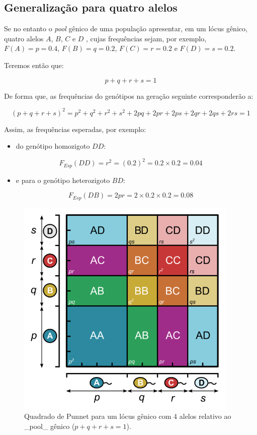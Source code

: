 \documentclass[
]{book}
\providecommand{\tightlist}{%
  \setlength{\itemsep}{0pt}\setlength{\parskip}{0pt}}
\begin{document}
\hypertarget{generalizauxe7uxe3o-para-quatro-alelos}{%
\subsection{Generalização para quatro alelos}\label{generalizauxe7uxe3o-para-quatro-alelos}}

Se no entanto o \emph{pool} gênico de uma população apresentar, em um lócus gênico, quatro alelos \(A\), \(B\), \(C\) e \(D\) , cujas frequências sejam, por exemplo, \(F(A) = p = 0.4\), \(F(B) = q = 0.2\), \(F(C) = r = 0.2\) e \(F(D) = s = 0.2\).

Teremos então que:

\[p + q + r + s = 1\]

De forma que, as frequências do genótipos na geração seguinte corresponderão a:

\[\left( p + q + r +s \right)^2 = p^2 + q^2 + r^2 + s^2 + 2pq + 2pr + 2ps + 2qr + 2qs + 2rs = 1\]

Assim, as frequências esperadas, por exemplo:

\begin{itemize}
\tightlist
\item
  do genótipo homozigoto \(DD\):
\end{itemize}

\[F_{Esp}(DD) = r^2 = (0.2)^2 = 0.2 \times 0.2 = 0.04\]

\begin{itemize}
\tightlist
\item
  e para o genótipo heterozigoto \(BD\):
\end{itemize}

\[F_{Esp}(DB) = 2pr = 2 \times 0.2 \times 0.2 = 0.08\]

\begin{figure}

{\centering \includegraphics[width=400px]{figs/punnett_4alelles} 

}

\caption{Quadrado de Punnet para um lócus gênico com 4 alelos relativo ao _pool_ gênico ($p+q+r+s=1$).}\label{fig:hwpunnet4}
\end{figure}
\end{document}

